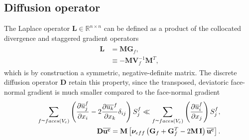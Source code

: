 \subsection{Diffusion operator}

The Laplace operator $ \mathbf{L} \in \mathbb{R}^{n \times n}$ can be defined as a product of the collocated divergence and staggered gradient operators
\begin{align}
\begin{split}
\mathbf{L} & = \mathbf{M} \mathbf{G}_f ,
\\
& \equiv - \mathbf{M} \mathbf{V}_f^{-1} \mathbf{M}^T ,
\end{split}
\label{eqn:LaplaceOp}
\end{align}
which is by construction a symmetric, negative-definite matrix. The discrete diffusion operator $\mathbf{D}$ retain this property, since the transposed, deviatoric face-normal gradient is much smaller compared to the face-normal gradient
\begin{align}
\begin{split}
\sumFV \left(\ddx {\av{u}_j^f}{i} - 2 \ddx {\av{u_k}^f}{k} \delta_{ij} 
 \right) \areaVec{j} 
\ll 
\sumFV \left( \ddx {\av{u}_i^f}{j} \right) \areaVec{j},
\\
\mathbf{D} \avb{u^c} = \mathbf{M}\left[ \nueffb \left( \mathbf{G}_f + \mathbf{G}_f^T - 2\mathbf{M}\,\mathbf{I} \right)\avb{u^c} \right] .
\end{split} 
\end{align}


